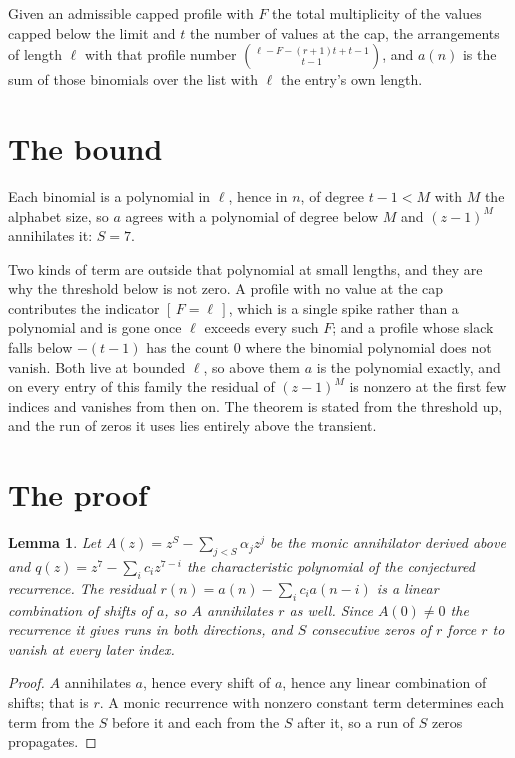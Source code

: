 \documentclass[11pt,a4paper]{article}
\theoremstyle{plain}
\newtheorem{lemma}[theorem]{Lemma}
\theoremstyle{definition}
\begin{document}
Given an admissible capped profile with $F$ the total multiplicity of the values capped below
the limit and $t$ the number of values at the cap, the arrangements of length $\ell$ with that
profile number $\binom{\ell-F-(r+1)t+t-1}{t-1}$, and $a(n)$ is the sum of those binomials
over the list with $\ell$ the entry's own length.

\section{The bound}

Each binomial is a polynomial in $\ell$, hence in $n$, of degree $t-1<M$ with $M$ the alphabet
size, so $a$ agrees with a polynomial of degree below $M$ and $(z-1)^{M}$ annihilates it:
$S=7$.

Two kinds of term are outside that polynomial at small lengths, and they are why the threshold
below is not zero. A profile with no value at the cap contributes the indicator
$[\,F=\ell\,]$, which is a single spike rather than a polynomial and is gone once
$\ell$ exceeds every such $F$; and a profile whose slack falls below $-(t-1)$ has the count
$0$ where the binomial polynomial does not vanish. Both live at bounded $\ell$, so above them
$a$ is the polynomial exactly, and on every entry of this family the residual of $(z-1)^{M}$
is nonzero at the first few indices and vanishes from then on. The theorem is stated from the
threshold up, and the run of zeros it uses lies entirely above the transient.

\section{The proof}

\begin{lemma}\label{lem:crit}
Let $A(z)=z^S-\sum_{j<S}\alpha_jz^{j}$ be the monic annihilator derived above and
$q(z)=z^{7}-\sum_ic_iz^{7-i}$ the characteristic polynomial of the conjectured
recurrence. The residual $r(n)=a(n)-\sum_ic_ia(n-i)$ is a linear combination of shifts of $a$,
so $A$ annihilates $r$ as well. Since $A(0)\ne0$ the recurrence it gives runs in both
directions, and $S$ consecutive zeros of $r$ force $r$ to vanish at every later index.
\end{lemma}

\begin{proof}
$A$ annihilates $a$, hence every shift of $a$, hence any linear combination of shifts; that is
$r$. A monic recurrence with nonzero constant term determines each term from the $S$ before it
and each from the $S$ after it, so a run of $S$ zeros propagates.
\end{proof}
\end{document}
